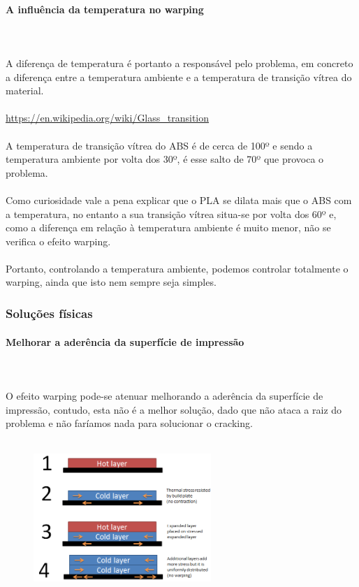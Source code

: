 \documentclass[11pt,a4paper]{article}
\begin{document}
			\paragraph{A influência da temperatura no warping}\mbox{}\\\\
A diferença de temperatura é portanto a responsável pelo problema, em concreto a diferença entre a temperatura ambiente e a temperatura de transição vítrea do material.
\\\\
\url{https://en.wikipedia.org/wiki/Glass_transition}
\\\\
A temperatura de transição vítrea do ABS é de cerca de 100º e sendo a temperatura ambiente por volta dos 30º, é esse salto de 70º que provoca o problema.
\\\\
Como curiosidade vale a pena explicar que o PLA se dilata mais que o ABS com a temperatura, no entanto a sua transição vítrea situa-se por volta dos 60º e, como a diferença em relação à temperatura ambiente é muito menor, não se verifica o efeito warping.
\\\\
Portanto, controlando a temperatura ambiente, podemos controlar totalmente o warping, ainda que isto nem sempre seja simples.
		\subsubsection{Soluções físicas}
			\paragraph{Melhorar a aderência da superfície de impressão}\mbox{}\\\\
O efeito warping pode-se atenuar melhorando a aderência da superfície de impressão, contudo, esta não é a melhor solução, dado que não ataca a raiz do problema e não faríamos nada para solucionar o cracking.
\\\\
\begin{figure}[H]
\centering
\includegraphics[width=0.6\textwidth,cfbox=azul_marcos 4pt 0pt]{FOTOS/CAUSA_WARPING_2}
\end{figure}
\end{document}
